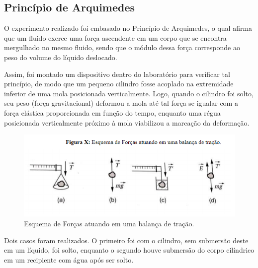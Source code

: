 \subsection{Princípio de Arquimedes}

O experimento realizado foi embasado no Princípio de Arquimedes, o qual afirma que um fluido exerce uma força ascendente em um corpo que se encontra mergulhado no mesmo fluido, sendo que o módulo dessa força corresponde ao peso do volume do líquido deslocado.

Assim, foi montado um dispositivo dentro do laboratório para verificar tal princípio, de modo que um pequeno cilindro fosse acoplado na extremidade inferior de uma mola posicionada verticalmente. Logo, quando o cilindro foi solto, seu peso (força gravitacional) deformou a mola até tal força se igualar com a força elástica proporcionada em função do tempo, enquanto uma régua posicionada verticalmente próximo à mola viabilizou a marcação da deformação.

\begin{figure}[H]
    \centering
    \includegraphics[scale=0.8]{images/Experimento1.png}
    \caption{Esquema de Forças atuando em uma balança de tração.}
\end{figure}

Dois casos foram realizados. O primeiro foi com o cilindro, sem submersão deste em um líquido, foi solto, enquanto o segundo houve submersão do corpo cilíndrico em um recipiente com água após ser solto.